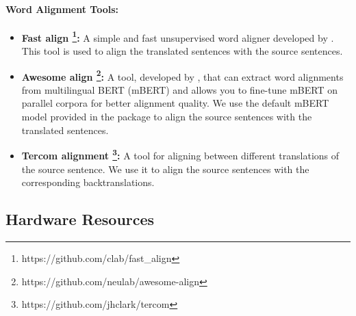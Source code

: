 \paragraph{Word Alignment Tools:}
\begin{itemize}
    \item \textbf{Fast align \footnote{https://github.com/clab/fast\_align}:} A simple and fast unsupervised word aligner developed by \citet{fast-align}. This tool is used to align the translated sentences with the source sentences.
    \item \textbf{Awesome align \footnote{https://github.com/neulab/awesome-align}:} A tool, developed by \citet{awesome-align}, that can extract word alignments from multilingual BERT (mBERT) and allows you to fine-tune mBERT on parallel corpora for better alignment quality. We use the default mBERT model provided in the package to align the source sentences with the translated sentences.
    \item \textbf{Tercom alignment \footnote{https://github.com/jhclark/tercom}:} A tool for aligning between different translations of the source sentence. We use it to align the source sentences with the corresponding backtranslations.
\end{itemize}

\subsection{Hardware Resources}
\label{sec:Setup:Hardware}

